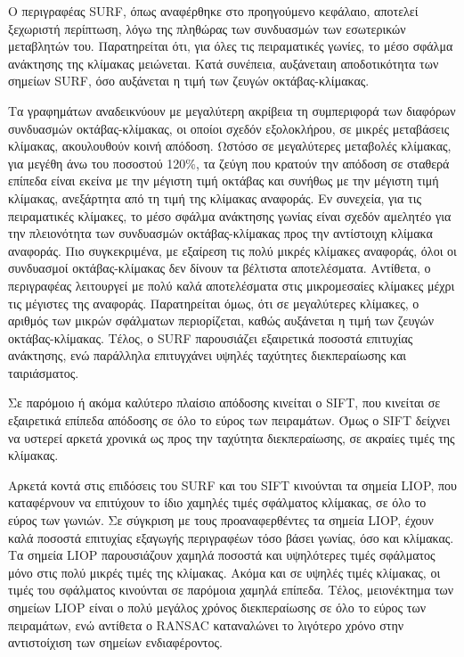 Ο περιγραφέας SURF, όπως αναφέρθηκε στο προηγούμενο κεφάλαιο, αποτελεί ξεχωριστή περίπτωση, λόγω της πληθώρας των συνδυασμών των εσωτερικών μεταβλητών του. 
Παρατηρείται ότι, για όλες τις πειραματικές γωνίες, το μέσο σφάλμα ανάκτησης της κλίμακας μειώνεται. Κατά συνέπεια, αυξάνεταιη αποδοτικότητα των σημείων SURF, όσο αυξάνεται η τιμή 
των ζευγών οκτάβας-κλίμακας.\par
Τα γραφημάτων αναδεικνύουν με μεγαλύτερη ακρίβεια τη συμπεριφορά των διαφόρων συνδυασμών οκτάβας-κλίμακας, οι οποίοι σχεδόν εξολοκλήρου, σε μικρές μεταβάσεις κλίμακας, ακουλουθούν κοινή απόδοση. 
Ωστόσο σε μεγαλύτερες μεταβολές κλίμακας, για μεγέθη άνω του ποσοστού 120\%, τα ζεύγη που κρατούν την απόδοση σε σταθερά επίπεδα είναι εκείνα με την μέγιστη τιμή οκτάβας 
και συνήθως με την μέγιστη τιμή κλίμακας, ανεξάρτητα από τη τιμή της κλίμακας αναφοράς.
Εν συνεχεία, για τις πειραματικές κλίμακες, το μέσο σφάλμα ανάκτησης γωνίας είναι σχεδόν αμελητέο για την πλειονότητα των συνδυασμών οκτάβας-κλίμακας προς την αντίστοιχη κλίμακα αναφοράς. Πιο συγκεκριμένα, 
με εξαίρεση τις πολύ μικρές κλίμακες αναφοράς, όλοι οι συνδυασμοί οκτάβας-κλίμακας δεν δίνουν τα βέλτιστα αποτελέσματα. Αντίθετα, ο περιγραφέας λειτουργεί με πολύ καλά αποτελέσματα 
στις μικρομεσαίες κλίμακες μέχρι τις μέγιστες της αναφοράς. Παρατηρείται όμως, ότι σε μεγαλύτερες κλίμακες, ο αριθμός των μικρών σφάλματων περιορίζεται, καθώς αυξάνεται η τιμή των ζευγών οκτάβας-κλίμακας.
Τέλος, ο SURF παρουσιάζει εξαιρετικά ποσοστά επιτυχίας ανάκτησης, ενώ παράλληλα επιτυγχάνει υψηλές ταχύτητες διεκπεραίωσης και ταιριάσματος.\par

Σε παρόμοιο ή ακόμα καλύτερο πλαίσιο απόδοσης κινείται ο SIFT, που κινείται σε εξαιρετικά επίπεδα απόδοσης σε όλο το εύρος των πειραμάτων. Όμως ο SIFT δείχνει να υστερεί αρκετά χρονικά ως προς την ταχύτητα διεκπεραίωσης, σε ακραίες τιμές της κλίμακας.\par

Αρκετά κοντά στις επιδόσεις του SURF και του SIFT κινούνται τα σημεία LIOP, που καταφέρνουν να επιτύχουν το ίδιο χαμηλές τιμές σφάλματος κλίμακας, σε όλο το εύρος των γωνιών. Σε σύγκριση με τους προαναφερθέντες τα σημεία LIOP, έχουν
καλά ποσοστά επιτυχίας εξαγωγής περιγραφέων τόσο βάσει γωνίας, όσο και κλίμακας. Τα σημεία LIOP παρουσιάζουν χαμηλά ποσοστά και υψηλότερες τιμές σφάλματος μόνο στις πολύ μικρές τιμές της κλίμακας. Ακόμα και σε υψηλές τιμές κλίμακας, 
οι τιμές του σφάλματος κινούνται σε παρόμοια χαμηλά επίπεδα. Τέλος, μειονέκτημα των σημείων LIOP είναι ο πολύ μεγάλος χρόνος διεκπεραίωσης σε όλο το εύρος των πειραμάτων, ενώ αντίθετα ο RANSAC καταναλώνει το λιγότερο χρόνο στην αντιστοίχιση
των σημείων ενδιαφέροντος. \par

